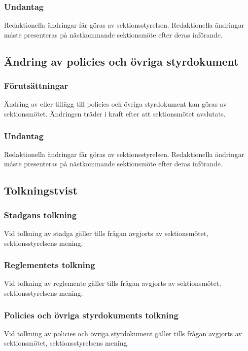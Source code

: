 \subsubsection{Undantag}
Redaktionella ändringar får göras av sektionsstyrelsen. Redaktionella ändringar måste presenteras på nästkommande sektionsmöte efter deras införande.

\subsection{Ändring av policies och övriga styrdokument}
\subsubsection{Förutsättningar}
Ändring av eller tillägg till policies och övriga styrdokument kan göras av sektionsmötet. Ändringen träder i kraft efter att sektionsmötet avslutats.

\subsubsection{Undantag}
Redaktionella ändringar får göras av sektionsstyrelsen. Redaktionella ändringar måste presenteras på nästkommande sektionsmöte efter deras införande.

\subsection{Tolkningstvist}

\subsubsection{Stadgans tolkning}
Vid tolkning av stadga gäller tills frågan avgjorts av sektionsmötet, sektionsstyrelsens mening.

\subsubsection{Reglementets tolkning}
Vid tolkning av reglemente gäller tills frågan avgjorts av sektionsmötet,
sektionsstyrelsens mening.

\subsubsection{Policies och övriga styrdokuments tolkning}
Vid tolkning av policies och övriga styrdokument gäller tills frågan avgjorts av sektionsmötet, sektionsstyrelsens mening.